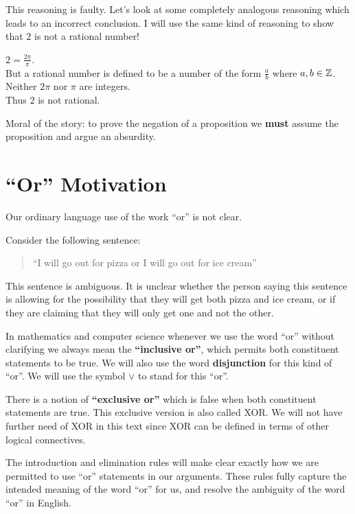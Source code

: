 	This reasoning is faulty.  Let's look at some completely analogous reasoning which leads to an incorrect conclusion.  I will use the same kind of reasoning to show that $2$ is not a rational number!
	
	\begin{fitch*}
		\textrm{$2 = \frac{2\pi}{\pi}$.}\\
		\textrm{But a rational number is defined to be a number of the form  $\frac{a}{b}$ where $a,b \in \mathbb{Z}$.}\\
		\textrm{Neither $2\pi$ nor $\pi$ are integers.}\\
		\textrm{Thus $2$ is not rational.}
	\end{fitch*}
	
	Moral of the story:  to prove the negation of a proposition we \textbf{must} assume the proposition and argue an absurdity.

\section{``Or'' Motivation}

Our ordinary language use of the work ``or'' is not clear.  

Consider the following sentence:

\begin{quote}
	``I will go out for pizza or I will go out for ice cream''
\end{quote}

This sentence is ambiguous.  It is unclear whether the person saying this sentence is allowing for the possibility that they will get both pizza and ice cream, or if they are claiming that they will only get one and not the other.

In mathematics and computer science whenever we use the word ``or'' without clarifying we always mean the \textbf{``inclusive or''}, which permits both constituent statements to be true.  We will also use the word  \textbf{disjunction} for this kind of ``or''.  We will use the symbol $\vee$ to stand for this ``or''.

There is a notion of \textbf{``exclusive or''} which is false when both constituent statements are true.  This exclusive version is also called XOR.  We will not have further need of XOR in this text since XOR can be defined in terms of other logical connectives.

The introduction and elimination rules will make clear exactly how we are permitted to use ``or'' statements in our arguments.  These rules fully capture the intended meaning of the word ``or'' for us, and resolve the ambiguity of the word ``or'' in English.

